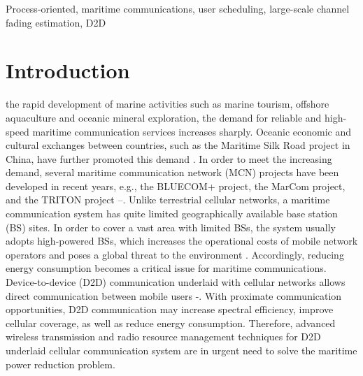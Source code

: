 \documentclass{ieeeaccess}
\begin{document}
\begin{keywords}
Process-oriented, maritime communications, user scheduling, large-scale channel fading estimation, D2D
\end{keywords}

\titlepgskip=-15pt

\maketitle

\section{Introduction}
 the rapid development of marine activities such as marine tourism, offshore aquaculture and oceanic mineral exploration, the demand for reliable and high-speed maritime communication services increases sharply. Oceanic economic and cultural exchanges between countries, such as the Maritime Silk Road project in China, have further promoted this demand \cite{p322}\cite{p101}. In order to meet the increasing demand, several maritime communication network (MCN) projects have been developed in recent years, e.g., the BLUECOM+ project, the MarCom project, and the TRITON project \cite{p321}--\cite{p32}.
Unlike terrestrial cellular networks, a maritime communication system has quite limited geographically available base station (BS) sites. In order to cover a vast area with limited BSs, the system usually adopts high-powered BSs, which increases the operational costs of mobile network operators and poses a global threat to the environment \cite{p33}.
Accordingly, reducing energy consumption becomes a critical issue for maritime communications.
Device-to-device (D2D) communication underlaid with cellular networks allows direct communication between mobile users \cite{p3331}-\cite{p3333}. With proximate communication opportunities, D2D communication may increase spectral efficiency, improve cellular coverage, as well as reduce energy consumption.
Therefore, advanced wireless transmission and radio resource management techniques for D2D underlaid cellular communication system are in urgent need to solve the maritime power reduction problem.
\end{document}
